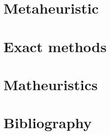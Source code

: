 \documentclass[a4paper,12pt]{report}
\newcommand\blankpage{%
    \null
    \thispagestyle{empty}%
    \addtocounter{page}{-1}%
    \newpage}
\begin{document}
\clearpage{\pagestyle{plain}\cleardoublepage}
\chapter{Metaheuristic}


\clearpage{\pagestyle{plain}\cleardoublepage}
\chapter{Exact methods}


\clearpage{\pagestyle{plain}\cleardoublepage}
\chapter{Matheuristics}


\afterpage{\blankpage}
    
\clearpage{\pagestyle{plain}\cleardoublepage}
\chapter{Bibliography}

\end{document}
